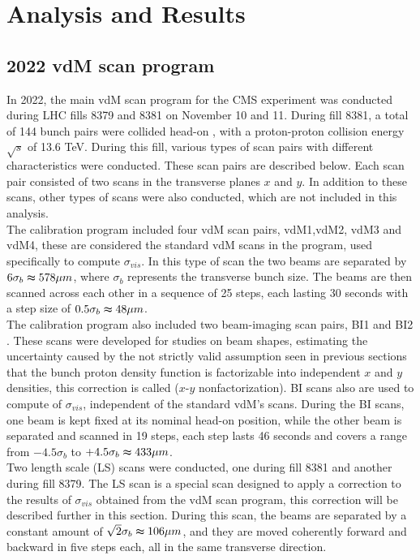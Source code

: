 \chapter{Analysis and Results}


\section{2022 vdM scan program}
\label{2022 vdM scan program}
In 2022, the main vdM scan program for the CMS experiment was conducted during LHC fills 8379 and 8381 on November 10 and 11. During fill 8381, a total of 144 bunch pairs were collided head-on , with a proton-proton collision energy $\sqrt{s}$ of 13.6 TeV. 
During this fill, various types of scan pairs with different characteristics were conducted. These scan pairs are described below. Each scan pair consisted of two scans in the transverse planes $x$ and $y$. In addition to these scans, other types of scans were also conducted, which are not included in this analysis.\\ 

The calibration program included four vdM scan pairs, vdM1,vdM2, vdM3 and vdM4, these are considered the standard vdM scans in the program, used specifically to compute $\sigma_{vis}$. In this type of scan the two beams are separated by $6\sigma_{b} \thickapprox 578\mu m$, where $\sigma_{b}$ represents the transverse bunch size. The beams are then scanned across each other in a sequence of 25 steps, each lasting 30 seconds with a step size of $0.5\sigma_{b} \thickapprox 48 \mu m$.\\

The calibration program also included two beam-imaging scan pairs, BI1 and BI2 . These scans were developed for studies on beam shapes, estimating the uncertainty caused by the not strictly valid assumption seen in previous sections that the bunch proton density function is factorizable into independent $x$ and $y$ densities, this correction is called  ($x$-$y$ nonfactorization). BI scans also are used to compute of $\sigma_{vis}$, independent of the standard vdM's scans. During the BI scans, one beam is kept fixed at its nominal head-on position, while the other beam is separated and scanned in 19 steps, each step lasts 46 seconds and covers a range from $-4.5\sigma_{b}$ to $+4.5\sigma_{b} \thickapprox 433 \mu m$.\\

Two length scale (LS) scans were conducted, one during fill 8381 and another during fill 8379. The LS scan is a special scan designed to apply a correction to the results of  $\sigma_{vis}$ obtained from the vdM scan program, this correction will be described further in this section. During this scan, the beams are separated by a constant amount of $\sqrt{2} \sigma_{b} \thickapprox 106 \mu m$, and they are moved coherently forward and backward in five steps each, all in the same transverse direction.\\

